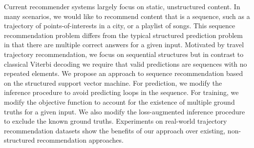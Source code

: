 
Current recommender systems largely focus on static, unstructured content.
In many scenarios, we would like to recommend content that is a sequence, %
such as %
a trajectory of points-of-interests in a city, or a playlist of songs.
This sequence recommendation problem 
differs from the typical structured prediction problem
in that there are multiple correct answers for a given input.
Motivated by travel trajectory recommendation, we focus on sequential structures
but in contrast to classical Viterbi decoding we require that
valid predictions are sequences with no repeated elements.
We propose an approach to sequence recommendation based on the structured support vector machine.
For prediction, we modify the inference procedure to avoid predicting loops in the sequence.
For training, we modify the objective function to account for the existence of multiple ground truths for a given input. We also modify the loss-augmented inference procedure to exclude the known ground truths.
Experiments on real-world trajectory recommendation datasets show the benefits of our approach over existing, non-structured recommendation approaches.
